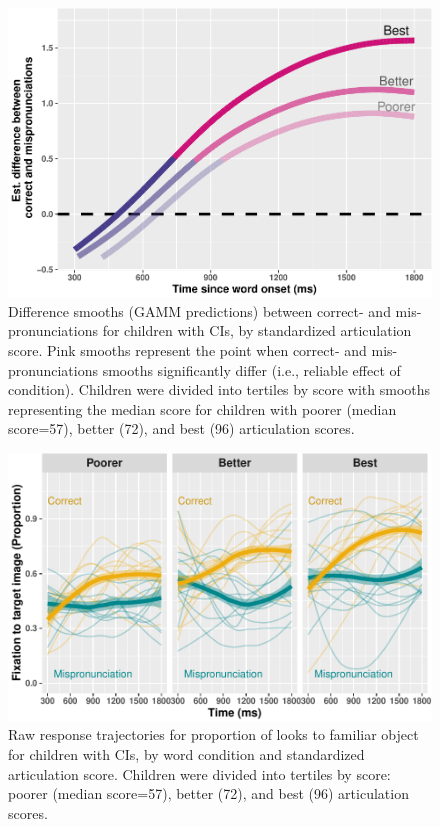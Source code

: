 \documentclass[
]{article}
\begin{document}
\begin{figure}
\centering
\includegraphics{2_modeling_files/figure-latex/CI-diff-plot-1.pdf}
\caption{\label{fig:CI-diff-plot}Difference smooths (GAMM predictions) between correct- and mis-pronunciations for children with CIs, by standardized articulation score. Pink smooths represent the point when correct- and mis-pronunciations smooths significantly differ (i.e., reliable effect of condition). Children were divided into tertiles by score with smooths representing the median score for children with poorer (median score=57), better (72), and best (96) articulation scores.}
\end{figure}

\begin{figure}
\centering
\includegraphics{2_modeling_files/figure-latex/CI-raw-plot-1.pdf}
\caption{\label{fig:CI-raw-plot}Raw response trajectories for proportion of looks to familiar object for children with CIs, by word condition and standardized articulation score. Children were divided into tertiles by score: poorer (median score=57), better (72), and best (96) articulation scores.}
\end{figure}
\end{document}
